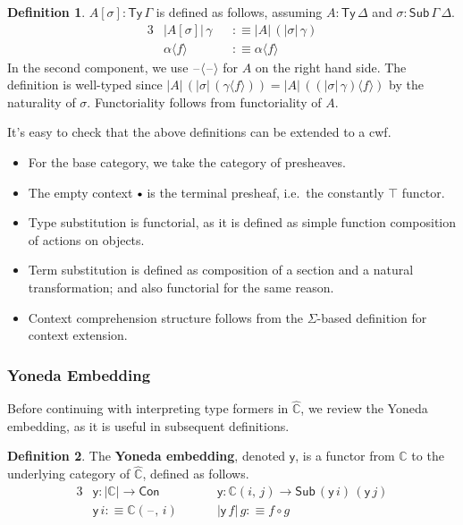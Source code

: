 \documentclass[12pt,a4paper,twoside,openany]{book}
\theoremstyle{remark}
\theoremstyle{definition}
\newtheorem{mydefinition}{Definition}
\theoremstyle{theorem}
\newcommand{\ms}[1]{\mathsf{#1}}
\newcommand{\mbb}[1]{\mathbb{#1}}
\newcommand{\Con}{\mathsf{Con}}
\newcommand{\Sub}{\mathsf{Sub}}
\newcommand{\Ty}{\mathsf{Ty}}
\newcommand{\blank}{\mathord{\hspace{1pt}\text{--}\hspace{1pt}}}
\newcommand{\emptycon}{\scaleobj{.75}\bullet}
\newcommand{\mbbC}{\mbb{C}}
\newcommand{\hmbbC}{\hat{\mbb{C}}}
\newcommand{\lab}{\langle}
\newcommand{\rab}{\rangle}
\newcommand{\defn}{:\equiv}
\newcommand{\yon}{\ms{y}}
\begin{document}
\begin{mydefinition}
$A[\sigma] : \Ty\,\Gamma$ is defined as follows, assuming
$A : \Ty\,\Delta$ and $\sigma : \Sub\,\Gamma\,\Delta$.
\begin{alignat*}{3}
  & |A[\sigma]|\,\gamma &&\defn |A|\,(|\sigma|\,\gamma) \\
  & \alpha \lab f \rab &&\defn \alpha \lab f \rab
\end{alignat*}
In the second component, we use $\blank\!\lab\!\blank\!\rab$ for $A$ on the right hand
side.  The definition is well-typed since $|A|\,(|\sigma|\,(\gamma\lab f \rab))
= |A|\,((|\sigma|\,\gamma)\lab f \rab)$ by the naturality of
$\sigma$. Functoriality follows from functoriality of $A$.
\end{mydefinition}

It's easy to check that the above definitions can be extended to a cwf.
\begin{itemize}
  \item For the base category, we take the category of presheaves.
  \item The empty context $\emptycon$ is the terminal presheaf, i.e.\ the
        constantly $\top$ functor.
  \item Type substitution is functorial, as it is defined as simple function
    composition of actions on objects.
  \item Term substitution is defined as composition of a section and
    a natural transformation; and also functorial for the same reason.
  \item Context comprehension structure follows from the $\Sigma$-based definition for
    context extension.
\end{itemize}

\subsubsection{Yoneda Embedding}

Before continuing with interpreting type formers in $\hmbbC$, we review the
Yoneda embedding, as it is useful in subsequent definitions.

\begin{mydefinition}
The \textbf{Yoneda embedding}, denoted $\ms{y}$, is a functor from $\mbbC$ to
the underlying category of $\hmbbC$, defined as follows.
\begin{alignat*}{3}
  & \yon : |\mbbC| \to \Con \hspace{3em}&& \yon : \mbbC(i,\,j) \to \Sub\,(\yon\,i)\,(\yon\,j)\\
  & \yon\,i \defn \mbbC(\blank,\,i) && |\yon\,f|\,g \defn f \circ g
\end{alignat*}
\end{mydefinition}
\end{document}
